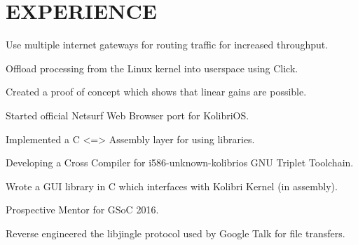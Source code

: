 \documentclass[letterpaper]{deedy-resume} %
\begin{document}
\hfill
%
%
\begin{minipage}[t]{0.66\textwidth} %
\section{EXPERIENCE}
\vspace{\topsep} %
\begin{tightitemize}
\item Use multiple internet gateways for routing traffic for increased throughput.
\item Offload processing from the Linux kernel into userspace using Click.
\item Created a proof of concept which shows that linear gains are possible.
\end{tightitemize}
\sectionspace %
\begin{tightitemize}
\item Started official Netsurf Web Browser port for KolibriOS.
\item Implemented a C <=> Assembly layer for using libraries.
\item Developing a Cross Compiler for i586-unknown-kolibrios GNU Triplet Toolchain.
\item Wrote a GUI library in C which interfaces with Kolibri Kernel (in assembly).
\item Prospective Mentor for GSoC 2016.
\end{tightitemize}
\sectionspace %
\begin{tightitemize}
\item Reverse engineered the libjingle protocol used by Google Talk for file transfers.

\end{tightitemize}
\end{minipage}
\end{document}
